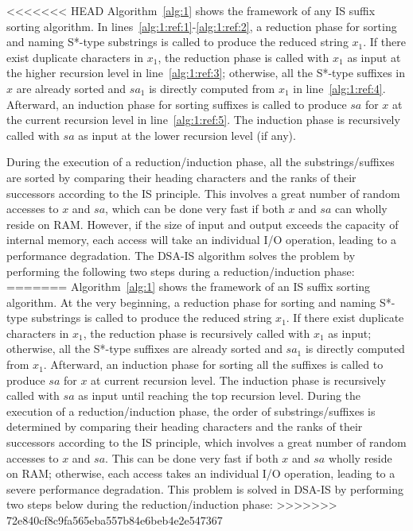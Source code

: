 \documentclass[10pt,journal,compsoc]{IEEEtran}
\begin{document}
<<<<<<< HEAD
Algorithm~\ref{alg:1} shows the framework of any IS suffix sorting algorithm. In lines~\ref{alg:1:ref:1}-\ref{alg:1:ref:2}, a reduction phase for sorting and naming S*-type substrings is called to produce the reduced string $x_1$. If there exist duplicate characters in $x_1$, the reduction phase is called with $x_1$ as input at the higher recursion level in line~\ref{alg:1:ref:3}; otherwise, all the S*-type suffixes in $x$ are already sorted and $sa_1$ is directly computed from $x_1$ in line~\ref{alg:1:ref:4}. Afterward, an induction phase for sorting suffixes is called to produce $sa$ for $x$ at the current recursion level in line~\ref{alg:1:ref:5}. The induction phase is recursively called with $sa$ as input at the lower recursion level (if any). 

During the execution of a reduction/induction phase, all the substrings/suffixes are sorted by comparing their heading characters and the ranks of their successors according to the IS principle. This involves a great number of random accesses to $x$ and $sa$, which can be done very fast if both $x$ and $sa$ can wholly reside on RAM. However, if the size of input and output exceeds the capacity of internal memory, each access will take an individual I/O operation, leading to a performance degradation. The DSA-IS algorithm solves the problem by performing the following two steps during a reduction/induction phase:
=======
Algorithm~\ref{alg:1} shows the framework of an IS suffix sorting algorithm. At the very beginning, a reduction phase for sorting and naming S*-type substrings is called to produce the reduced string $x_1$. If there exist duplicate characters in $x_1$, the reduction phase is recursively called with $x_1$ as input; otherwise, all the S*-type suffixes are already sorted and $sa_1$ is directly computed from $x_1$.
Afterward, an induction phase for sorting all the suffixes is called to produce $sa$ for $x$ at current recursion level. The induction phase is recursively called with $sa$ as input until reaching the top recursion level. During the execution of a reduction/induction phase, the order of substrings/suffixes is determined by comparing their heading characters and the ranks of their successors according to the IS principle, which involves a great number of random accesses to $x$ and $sa$. This can be done very fast if both $x$ and $sa$ wholly reside on RAM; otherwise, each access takes an individual I/O operation, leading to a severe performance degradation. This problem is solved in DSA-IS by performing two steps below during the reduction/induction phase:
>>>>>>> 72e840cf8c9fa565eba557b84e6beb4e2e547367
\end{document}

